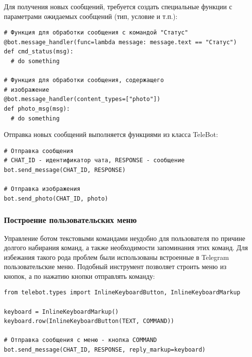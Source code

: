 Для получения новых сообщений, требуется создать специальные функции
с параметрами ожидаемых сообщений (тип, условие и т.п.):

\begin{lstlisting}
# Функция для обработки сообщения с командой "Статус" 
@bot.message_handler(func=lambda message: message.text == "Статус")
def cmd_status(msg):
  # do something

# Функция для обработки сообщения, содержащего
# изображение
@bot.message_handler(content_types=["photo"])
def photo_msg(msg):
  # do something
\end{lstlisting}

Отправка новых сообщений выполняется функциями из класса TeleBot:

\begin{lstlisting}
# Отправка сообщения
# CHAT_ID - идентификатор чата, RESPONSE - сообщение
bot.send_message(CHAT_ID, RESPONSE)

# Отправка изображения
bot.send_photo(CHAT_ID, photo)
\end{lstlisting}

\subsubsection{Построение пользовательских меню} 

Управление ботом текстовыми командами неудобно для пользователя по причине
долгого набирания команд, а также необходимости запоминания этих команд. Для
избежания такого рода проблем были использованы встроенные в Telegram
пользовательские меню. Подобный инструмент позволяет строить меню из кнопок,
а по нажатию кнопки отправлять команду:

\begin{lstlisting}
from telebot.types import InlineKeyboardButton, InlineKeyboardMarkup

keyboard = InlineKeyboardMarkup() 
keyboard.row(InlineKeyboardButton(TEXT, COMMAND))

# Отправка сообщения с меню - кнопка COMMAND
bot.send_message(CHAT_ID, RESPONSE, reply_markup=keyboard)
\end{lstlisting}
